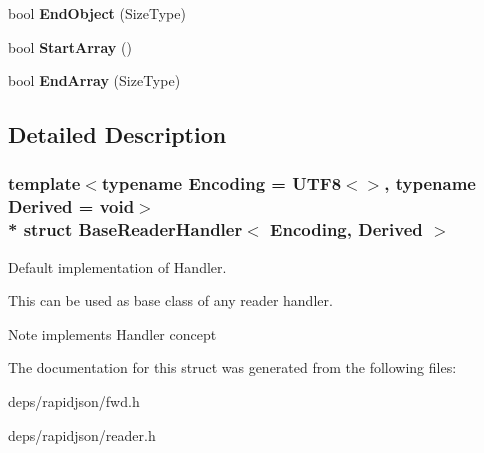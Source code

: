 \begin{DoxyCompactItemize}
\item 
bool {\bfseries End\+Object} (Size\+Type)\hypertarget{struct_base_reader_handler_a0406cee0af26bc3a0b7fb2414537b0ab}{}\label{struct_base_reader_handler_a0406cee0af26bc3a0b7fb2414537b0ab}

\item 
bool {\bfseries Start\+Array} ()\hypertarget{struct_base_reader_handler_a9dbb1143a250a904bb18a174553a3a00}{}\label{struct_base_reader_handler_a9dbb1143a250a904bb18a174553a3a00}

\item 
bool {\bfseries End\+Array} (Size\+Type)\hypertarget{struct_base_reader_handler_ae9d60a8779b6a77a7f283d64961879fb}{}\label{struct_base_reader_handler_ae9d60a8779b6a77a7f283d64961879fb}

\end{DoxyCompactItemize}


\subsection{Detailed Description}
\subsubsection*{template$<$typename Encoding = U\+T\+F8$<$$>$, typename Derived = void$>$\\*
struct Base\+Reader\+Handler$<$ Encoding, Derived $>$}

Default implementation of Handler. 

This can be used as base class of any reader handler. \begin{DoxyNote}{Note}
implements Handler concept 
\end{DoxyNote}


The documentation for this struct was generated from the following files\+:\begin{DoxyCompactItemize}
\item 
deps/rapidjson/fwd.\+h\item 
deps/rapidjson/reader.\+h\end{DoxyCompactItemize}
